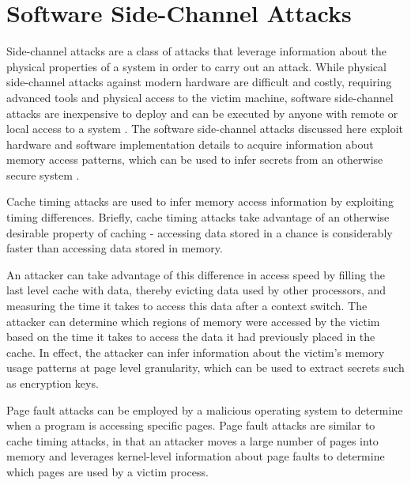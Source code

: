 

\section{Software Side-Channel Attacks}

Side-channel attacks are a class of attacks that leverage information about the physical properties of a system in order to carry out an attack. While physical side-channel attacks against modern hardware are difficult and costly, requiring advanced tools and physical access to the victim machine, software side-channel attacks are inexpensive to deploy and can be executed by anyone with remote or local access to a system \cite{costan_intel_2016}. The software side-channel attacks discussed here exploit hardware and software implementation details to acquire information about memory access patterns, which can be used to infer secrets from an otherwise secure system \cite{gotzfried_cache_2017, schwarz_malware_2017, xu_controlled-channel_2015, shinde_preventing_2015}. 

Cache timing attacks are used to infer memory access information by exploiting timing differences. Briefly, cache timing attacks take advantage of an otherwise desirable property of caching - accessing data stored in a chance is considerably faster than accessing data stored in memory. 

An attacker can take advantage of this difference in access speed by filling the last level cache with data, thereby evicting data used by other processors, and measuring the time it takes to access this data after a context switch. The attacker can determine which regions of memory were accessed by the victim based on the time it takes to access the data it had previously placed in the cache. In effect, the attacker can infer information about the victim's memory usage patterns at page level granularity, which can be used to extract secrets such as encryption keys.

Page fault attacks can be employed by a malicious operating system to determine when a program is accessing specific pages. Page fault attacks are similar to cache timing attacks, in that an attacker moves a large number of pages into memory and leverages kernel-level information about page faults to determine which pages are used by a victim process.

